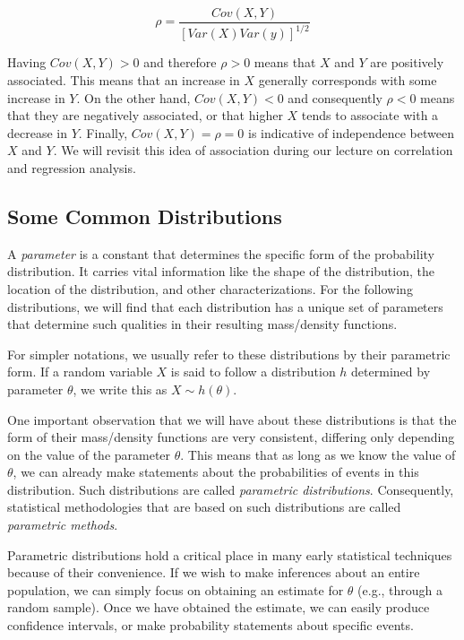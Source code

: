 \documentclass{article}
\begin{document}
$$
\rho = \frac{Cov(X,Y)}{[Var(X) Var(y)]^{1/2}}
$$

Having $Cov(X,Y) > 0$ and therefore $\rho > 0$ means that $X$ and $Y$ are positively associated. This means that an increase in $X$ generally corresponds with some increase in $Y$. On the other hand, $Cov(X,Y) < 0$ and consequently $\rho < 0$ means that they are negatively associated, or that higher $X$ tends to associate with a decrease in $Y$. Finally, $Cov(X,Y) = \rho = 0$ is indicative of independence between $X$ and $Y$. We will revisit this idea of association during our lecture on correlation and regression analysis.

\subsection{Some Common Distributions}

A \emph{parameter} is a constant that determines the specific form of the probability distribution. It carries vital information like the shape of the distribution, the location of the distribution, and other characterizations. For the following distributions, we will find that each distribution has a unique set of parameters that determine such qualities in their resulting mass/density functions.

For simpler notations, we usually refer to these distributions by their parametric form. If a random variable $X$ is said to follow a distribution $h$ determined by parameter $\theta$, we write this as $X \sim h(\theta)$.

One important observation that we will have about these distributions is that the form of their mass/density functions are very consistent, differing only depending on the value of the parameter $\theta$. This means that as long as we know the value of $\theta$, we can already make statements about the probabilities of events in this distribution. Such distributions are called \emph{parametric distributions}. Consequently, statistical methodologies that are based on such distributions are called \emph{parametric methods}.

Parametric distributions hold a critical place in many early statistical techniques because of their convenience. If we wish to make inferences about an entire population, we can simply focus on obtaining an estimate for $\theta$ (e.g., through a random sample). Once we have obtained the estimate, we can easily produce confidence intervals, or make probability statements about specific events.
\end{document}

